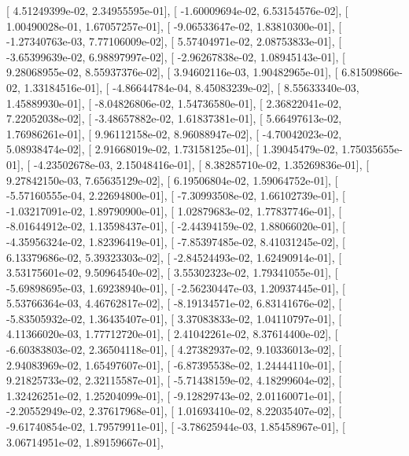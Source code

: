 \documentclass{article}
\begin{document}
       [  4.51249399e-02,   2.34955595e-01],
       [ -1.60009694e-02,   6.53154576e-02],
       [  1.00490028e-01,   1.67057257e-01],
       [ -9.06533647e-02,   1.83810300e-01],
       [ -1.27340763e-03,   7.77106009e-02],
       [  5.57404971e-02,   2.08753833e-01],
       [ -3.65399639e-02,   6.98897997e-02],
       [ -2.96267838e-02,   1.08945143e-01],
       [  9.28068955e-02,   8.55937376e-02],
       [  3.94602116e-03,   1.90482965e-01],
       [  6.81509866e-02,   1.33184516e-01],
       [ -4.86644784e-04,   8.45083239e-02],
       [  8.55633340e-03,   1.45889930e-01],
       [ -8.04826806e-02,   1.54736580e-01],
       [  2.36822041e-02,   7.22052038e-02],
       [ -3.48657882e-02,   1.61837381e-01],
       [  5.66497613e-02,   1.76986261e-01],
       [  9.96112158e-02,   8.96088947e-02],
       [ -4.70042023e-02,   5.08938474e-02],
       [  2.91668019e-02,   1.73158125e-01],
       [  1.39045479e-02,   1.75035655e-01],
       [ -4.23502678e-03,   2.15048416e-01],
       [  8.38285710e-02,   1.35269836e-01],
       [  9.27842150e-03,   7.65635129e-02],
       [  6.19506804e-02,   1.59064752e-01],
       [ -5.57160555e-04,   2.22694800e-01],
       [ -7.30993508e-02,   1.66102739e-01],
       [ -1.03217091e-02,   1.89790900e-01],
       [  1.02879683e-02,   1.77837746e-01],
       [ -8.01644912e-02,   1.13598437e-01],
       [ -2.44394159e-02,   1.88066020e-01],
       [ -4.35956324e-02,   1.82396419e-01],
       [ -7.85397485e-02,   8.41031245e-02],
       [  6.13379686e-02,   5.39323303e-02],
       [ -2.84524493e-02,   1.62490914e-01],
       [  3.53175601e-02,   9.50964540e-02],
       [  3.55302323e-02,   1.79341055e-01],
       [ -5.69898695e-03,   1.69238940e-01],
       [ -2.56230447e-03,   1.20937445e-01],
       [  5.53766364e-03,   4.46762817e-02],
       [ -8.19134571e-02,   6.83141676e-02],
       [ -5.83505932e-02,   1.36435407e-01],
       [  3.37083833e-02,   1.04110797e-01],
       [  4.11366020e-03,   1.77712720e-01],
       [  2.41042261e-02,   8.37614400e-02],
       [ -6.60383803e-02,   2.36504118e-01],
       [  4.27382937e-02,   9.10336013e-02],
       [  2.94083969e-02,   1.65497607e-01],
       [ -6.87395538e-02,   1.24444110e-01],
       [  9.21825733e-02,   2.32115587e-01],
       [ -5.71438159e-02,   4.18299604e-02],
       [  1.32426251e-02,   1.25204099e-01],
       [ -9.12829743e-02,   2.01160071e-01],
       [ -2.20552949e-02,   2.37617968e-01],
       [  1.01693410e-02,   8.22035407e-02],
       [ -9.61740854e-02,   1.79579911e-01],
       [ -3.78625944e-03,   1.85458967e-01],
       [  3.06714951e-02,   1.89159667e-01],
\end{document}
